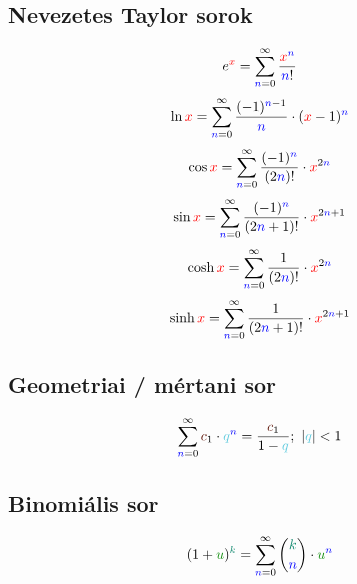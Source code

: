 \documentclass[a4paper,12pt]{article}
\begin{document}
\subsection{Nevezetes Taylor sorok}
\begin{equation}
e^{\x} = \sumi \frac{{\x}^{\n}}{\n!}
\end{equation}
\begin{equation}
\ln \x = \sumi \frac{(-1)^{\n-1}}{\n} \cdot (\x-1)^{\n}
\end{equation}
\begin{equation}
\cos \x = \sumi \frac{(-1)^{\n}}{(2\n)!} \cdot \x^{2\n}
\end{equation}
\begin{equation}
\sin \x = \sumi \frac{(-1)^{\n}}{(2\n+1)!} \cdot \x^{2\n+1}
\end{equation}
\begin{equation}
\cosh \x = \sumi \frac{1}{(2\n)!} \cdot \x^{2\n}
\end{equation}
\begin{equation}
\sinh \x = \sumi \frac{1}{(2\n+1)!} \cdot \x^{2\n+1}
\end{equation}

\subsection{Geometriai / mértani sor}
\begin{equation}
\sumi \c_1 \cdot \q^{\n} = \frac{\c_1}{1-\q};\ |\q| < 1
\end{equation}

\subsection{Binomiális sor}
\begin{equation}
  (1+\u)^{\k} = \sumi \binom{\k}{\n} \cdot {\u}^{\n}
\end{equation}
\end{document}
